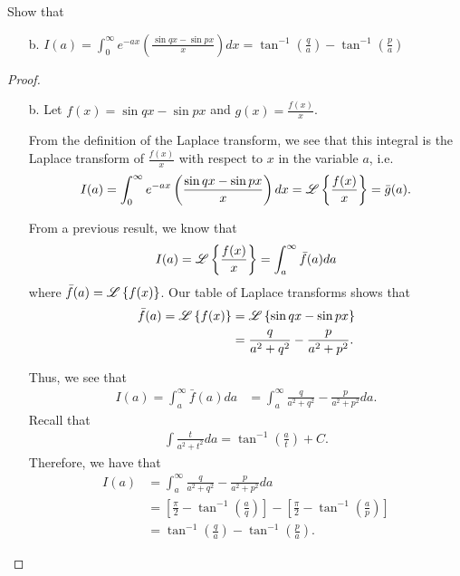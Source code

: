 \begin{problem}{4.29}
  Show that
  \begin{enumerate}
    \item  [b.]$\displaystyle I(a) = \int_0^{\infty} e^{-ax}\left(\frac{\sin qx - \sin px}{x}\right)dx = \tan^{-1}\left(\frac{q}{a}\right) - \tan^{-1}\left(\frac{p}{a}\right)$
  \end{enumerate}
\end{problem}

\begin{proof}
  \begin{enumerate}
    \item[b.]
      Let $f(x) = \sin qx - \sin px$ and $\displaystyle g(x) = \frac{f(x)}{x}$.

      From the definition of the Laplace transform, we see that this integral is the Laplace transform of
      $\displaystyle \frac{f(x)}{x}$ with respect to $x$ in the variable $a$, i.e.
      \begin{align*}
        I(a) = \int_0^{\infty} e^{-ax}\left(\frac{\sin qx - \sin px}{x}\right)dx = \mathscr{L}\left\{ {\frac{f(x)}{x}} \right\} = \bar{g}(a).
      \end{align*}

      From a previous result, we know that
      \begin{align*}
        I(a) = \mathscr{L}\left\{ {\frac{f(x)}{x}} \right\} = \int_a^\infty \bar{f}(a) da
      \end{align*}
      where $\bar{f}(a) = \mathscr{L}\left\{ {f(x)} \right\}$. Our table of Laplace transforms shows that
      \begin{align*}
        \bar{f}(a) = \mathscr{L}\left\{ {f(x)} \right\} &= \mathscr{L}\left\{ {\sin qx - \sin px} \right\} \\
        &= \frac{q}{a^2 + q^2} - \frac{p}{a^2 + p^2}.
      \end{align*}

      Thus, we see that
      \begin{align*}
        I(a) = \int_a^\infty \bar{f}(a) da &= \int_a^\infty \frac{q}{a^2 + q^2} - \frac{p}{a^2 + p^2} da.
      \end{align*}
      Recall that
      \begin{align*}
        \int \frac{t}{a^2 + t^2}da = \tan^{-1}\left(\frac{a}{t}\right) + C.
      \end{align*}
      Therefore, we have that
      \begin{align*}
        I(a) &= \int_a^\infty \frac{q}{a^2 + q^2} - \frac{p}{a^2 + p^2} da \\
        &= \left[\frac{\pi}{2} - \tan^{-1}\left(\frac{a}{q}\right)\right] - \left[\frac{\pi}{2} - \tan^{-1}\left(\frac{a}{p}\right)\right] \\
        &= \tan^{-1}\left(\frac{q}{a}\right) - \tan^{-1}\left(\frac{p}{a}\right).
      \end{align*}

  \end{enumerate}
\end{proof}
\newpage
